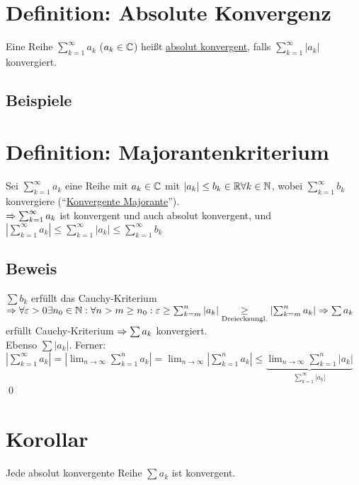 \section{Definition: Absolute Konvergenz}\label{7.10}
Eine Reihe $\sum_{k=1}^\infty a_k$ ($a_k \in \mathbb{C}$) heißt \underline{absolut konvergent}, falls $\sum_{k=1}^\infty |a_k|$ konvergiert.

\subsection*{Beispiele}

\section{Definition: Majorantenkriterium}\label{7.11}
Sei $\sum_{k=1}^\infty a_k$ eine Reihe mit $a_k \in \mathbb{C}$ mit $|a_k| \le b_k \in \mathbb{R} \forall k \in \mathbb{N}$, wobei $\sum_{k=1}^\infty b_k$ konvergiere (``\underline{Konvergente Majorante}'').\\
$\Rightarrow \sum_{k=1}^\infty a_k$ ist konvergent und auch absolut konvergent, und $\left|\sum_{k=1}^\infty a_k\right| \le \sum_{k=1}^\infty |a_k| \le \sum_{k=1}^\infty b_k$

\subsection*{Beweis}
$\sum b_k$ erfüllt das Cauchy-Kriterium $\Rightarrow \forall \varepsilon > 0 \exists n_0 \in \mathbb{N}: \forall n > m \ge n_0: \varepsilon \ge \sum_{k=m}^n |a_k| \underset{\text{Dreiecksungl.}}{\ge} \left|\sum_{k=m}^n a_k\right| \Rightarrow \sum a_k$ erfüllt Cauchy-Kriterium $\Rightarrow \sum a_k$ konvergiert.\\
Ebenso $\sum |a_k|$. Ferner:\\
$\left|\sum_{k=1}^\infty a_k\right| = \left|\lim_{n \to \infty} \sum_{k=1}^n a_k\right| = \lim_{n \to \infty} \left|\sum_{k=1}^n a_k\right| \le \underbrace{\lim_{n \to \infty} \sum_{k=1}^n |a_k|}_{\sum_{k=1}^\infty |a_k|}$ \qed

\section{Korollar}\label{7.12}
Jede absolut konvergente Reihe $\sum a_k$ ist konvergent.


